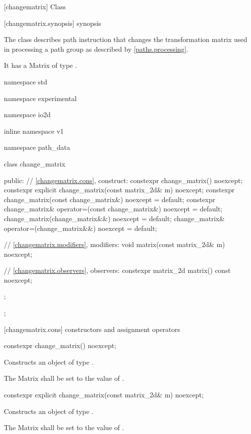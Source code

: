  [changematrix] {Class }

 [changematrix.synopsis] { synopsis}

\pnum
{}
The class  describes path instruction that changes the transformation matrix used in processing a path group as described by \ref{paths.processing}.

\pnum
It has a Matrix of type .

\begin{codeblock}
namespace std { namespace experimental { namespace io2d { inline namespace v1 {
  namespace path_data {
    class change_matrix {
    public:
      // \ref{changematrix.cons}, construct:
      constexpr change_matrix() noexcept;
      constexpr explicit change_matrix(const matrix_2d& m) noexcept;
      constexpr change_matrix(const change_matrix&) noexcept = default;
      constexpr change_matrix& operator=(const change_matrix&)
        noexcept = default;
      change_matrix(change_matrix&&) noexcept = default;
      change_matrix& operator=(change_matrix&&) noexcept = default;

      // \ref{changematrix.modifiers}, modifiers:
      void matrix(const matrix_2d& m) noexcept;

      // \ref{changematrix.observers}, observers:
      constexpr matrix_2d matrix() const noexcept;
    };
  };
} } } }
\end{codeblock}

 [changematrix.cons] { constructors and assignment operators}

\begin{itemdecl}
constexpr change_matrix() noexcept;
\end{itemdecl}
\begin{itemdescr}
\pnum
\effects
Constructs an object of type .

\pnum
The Matrix shall be set to the value of .
\end{itemdescr}

\begin{itemdecl}
constexpr explicit change_matrix(const matrix_2d& m) noexcept;
\end{itemdecl}
\begin{itemdescr}
\pnum
\effects
Constructs an object of type .

\pnum
The Matrix shall be set to the value of .
\end{itemdescr}

